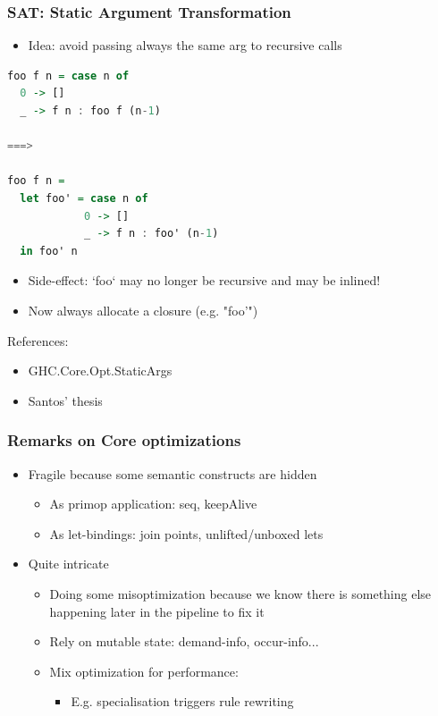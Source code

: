 \documentclass[aspectratio=169]{beamer}
\begin{document}
\begin{frame}[fragile]
  \frametitle{SAT: Static Argument Transformation}
  \begin{itemize}
    \item Idea: avoid passing always the same arg to recursive calls
  \end{itemize}
  \begin{lstlisting}[language=haskell,basicstyle=\tiny]
foo f n = case n of
  0 -> []
  _ -> f n : foo f (n-1)

===>

foo f n =
  let foo' = case n of
            0 -> []
            _ -> f n : foo' (n-1)
  in foo' n
\end{lstlisting}
  \begin{itemize}
    \item Side-effect: `foo` may no longer be recursive and may be inlined!
    \item Now always allocate a closure (e.g. "foo'")
  \end{itemize}

  References:
  \begin{itemize}
    \item GHC.Core.Opt.StaticArgs
    \item Santos' thesis
  \end{itemize}
\end{frame}

\begin{frame}
  \frametitle{Remarks on Core optimizations}
  \begin{itemize}
    \item Fragile because some semantic constructs are hidden
      \begin{itemize}
        \item As primop application: seq, keepAlive
        \item As let-bindings: join points, unlifted/unboxed lets
      \end{itemize}
    \item Quite intricate
      \begin{itemize}
        \item Doing some misoptimization because we know there is something else
          happening later in the pipeline to fix it
        \item Rely on mutable state: demand-info, occur-info...
        \item Mix optimization for performance:
          \begin{itemize}
            \item E.g. specialisation triggers rule rewriting
          \end{itemize}
      \end{itemize}
  \end{itemize}
\end{frame}
\end{document}
